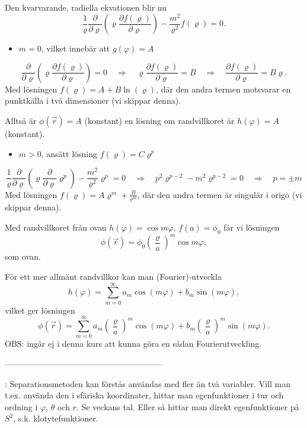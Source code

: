 \documentclass[%
oneside,                 %
final,                   %
10pt]{article}
\newcommand{\longinlinecomment}[3]{{\color{red}{\bf #1}: #2}}
\begin{document}
Den kvarvarande, radiella ekvationen blir nu
$$
\frac{1}{\varrho} \frac{\partial}{\partial\varrho} \left( \varrho \frac{\partial f(\varrho)}{\partial\varrho} \right) - \frac{m^2}{\varrho^2} f(\varrho) = 0.
$$

\begin{itemize}
\item $m=0$, vilket innebär att $g(\varphi) = A$
\end{itemize}

\noindent
$$
\frac{\partial}{\partial\varrho} \left( \varrho \frac{\partial f(\varrho)}{\partial\varrho} \right) = 0 \quad \Rightarrow \quad
\varrho \frac{\partial f(\varrho)}{\partial\varrho} = B \quad \Rightarrow \quad
\frac{\partial f(\varrho)}{\partial\varrho} = B \varrho.
$$
Med lösningen $f(\varrho) = A + B \ln(\varrho)$, där den andra termen motsvarar en punktkälla i två dimensioner (vi skippar denna).

Alltså är $\phi(\vec{r}) = A$ (konstant) en lösning om randvillkoret är $h(\varphi) = A$ (konstant).

\begin{itemize}
\item $m > 0$, ansätt lösning $f(\varrho) = C \varrho^p$
\end{itemize}

\noindent
$$
\frac{1}{\varrho} \frac{\partial}{\partial\varrho} \left( \varrho \frac{\partial}{\partial\varrho} \varrho^p \right) - \frac{m^2}{\varrho^2} \varrho^p = 0 \quad \Rightarrow \quad p^2 \varrho^{p-2} - m^2 \varrho^{p-2} = 0 \quad \Rightarrow \quad 
p = \pm m
$$
Med lösningen $f(\varrho) = A \varrho^m + \frac{B}{\varrho^m}$, där den andra termen är singulär i origo (vi skippar denna).

Med randvillkoret från ovan $h(\varphi) = \cos m \varphi$, $f(a) = \phi_0$ får vi lösningen
$$
\phi(\vec{r}) = \phi_0 \left( \frac{\varrho}{a} \right)^m \cos m\varphi,
$$
som ovan.

För ett mer allmänt randvillkor kan man (Fourier)-utveckla
$$
h(\varphi) = \sum_{m=0}^\infty a_m \cos(m\varphi) + b_m \sin(m\varphi),
$$
vilket ger lösningen
$$
\phi(\vec{r}) = \sum_{m=0}^\infty a_m \left( \frac{\varrho}{a} \right)^m \cos(m\varphi) + b_m \left( \frac{\varrho}{a} \right)^m \sin(m\varphi).
$$
OBS: ingår ej i denna kurs att kunna göra en sådan Fourierutveckling.

---------------------------------------------------------


\longinlinecomment{Comment 5}{ Separationsmetoden kan förstås användas med fler än två variabler. Vill man t.ex. använda den i sfäriska koordinater, hittar man egenfunktioner i tur och ordning i $\varphi$, $\theta$ och $r$. Se veckans tal. Eller så hittar man direkt egenfunktioner på $S^2$, s.k. klotytefunktioner. }{ Separationsmetoden kan förstås användas }




\printindex
\end{document}
